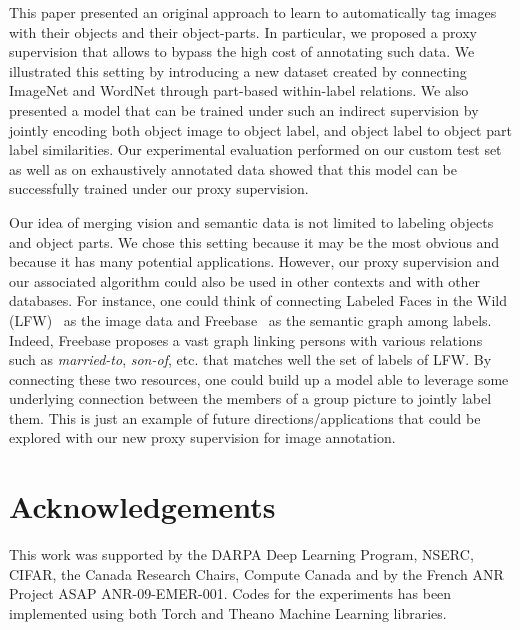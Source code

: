 This paper presented an original approach to learn to automatically 
tag images with their objects and their object-parts.
%
In particular, we proposed a proxy supervision that allows to
bypass the high cost of annotating such data.
%
We illustrated this setting by introducing a new dataset created by
connecting  ImageNet and WordNet through part-based within-label
relations.
%
We also presented a model that can be trained under such an indirect
supervision by jointly encoding both object image to object label, and
object label to object part label similarities.
%
Our experimental evaluation performed on our custom test set as well
as on exhaustively annotated data showed that this model can be
successfully trained under our proxy supervision.

Our idea of merging vision and semantic data is not limited to
labeling objects and object parts.
%
We chose this setting because it may be the most obvious and
because it has many potential applications.
%
However, our proxy supervision and our associated algorithm could also
be used in other contexts and with other databases.
%
For instance, one could think of connecting Labeled Faces in the
Wild (LFW)~\cite{LFWTech} as the image data and Freebase~\cite{freebase} as
the semantic graph among labels.
%
Indeed, Freebase proposes a vast graph linking persons with various
relations such as {\it married-to}, {\it son-of}, etc. that matches
well the set of labels of LFW.
%
By connecting these two resources, one could build up a model able to
leverage some underlying connection between the members of a group picture
to jointly label them. 
%
This is just an example of future directions/applications that could
be explored with our new proxy supervision for image annotation.

\section{Acknowledgements}

This work was supported by the DARPA Deep Learning Program, NSERC, CIFAR, the
Canada Research Chairs, Compute Canada and by the French ANR Project ASAP
ANR-09-EMER-001. Codes for the experiments has been implemented using both
Torch \cite{collobert:2011c} and Theano \cite{bergstra+al:2010-scipy} Machine
Learning libraries.




